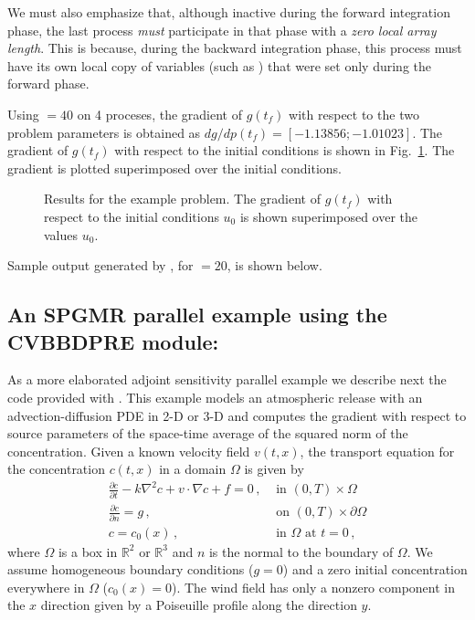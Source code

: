 We must also emphasize that, although inactive during the forward integration phase, 
the last process {\em must} participate in that phase with a 
{\em zero local array length}. 
This is because, during the backward integration phase, this process must
have its own local copy of variables (such as ) that were set
only during the forward phase.

Using  $=40$ on 4 proceses, the gradient of $g(t_f)$ with respect to 
the two problem parameters is obtained as $dg/dp(t_f) = [ -1.13856; -1.01023]$.
The gradient of $g(t_f)$ with respect to the initial conditions is shown in
Fig.~\ref{f:cvsadjnonx_p}. The gradient is plotted superimposed over the initial conditions.
\begin{figure}
  {\centerline{}}
  \caption{Results for the  example problem.
    The gradient of $g(t_f)$ with respect to the initial conditions $u_0$ 
    is shown superimposed over the values $u_0$.}
  \label{f:cvsadjnonx_p}
\end{figure}
Sample output generated by , for  $=20$, is shown below.



\newpage
\subsection{An SPGMR parallel example using the CVBBDPRE module: }
\label{ss:cvsadjkryx_p}

As a more elaborated adjoint sensitivity parallel example we describe next
the  code provided with {\cvodes}. This example models an atmospheric 
release with an advection-diffusion PDE in 2-D or 3-D and computes the gradient 
with respect to source parameters of the space-time average of the squared norm
of the concentration.
Given a known velocity field $v(t,x)$, the transport equation for
the concentration $c(t,x)$ in a domain $\Omega$ is given by
\begin{equation}\label{e:cvsadjkryx_p_PDE}
  \begin{split}
    \frac{\partial c}{\partial t} - k \nabla^2 c + v \cdot \nabla c + f = 0 \, , 
    &\text{ in } (0,T) \times \Omega \\
    \frac{\partial c}{\partial n} = g \, ,
    &\text{ on } (0,T) \times \partial\Omega \\
    c = c_0(x) \, ,
    &\text{ in } \Omega \text{ at } t = 0 \, ,
  \end{split}
\end{equation}
where $\Omega$ is a box in ${\mathbb{R}}^2$ or ${\mathbb{R}}^3$ and $n$ is the 
normal to the boundary of $\Omega$.
We assume homogeneous boundary conditions ($g = 0$) and a zero initial
concentration everywhere in $\Omega$ ($c_0(x) = 0$). The wind field has only a
nonzero component in the $x$ direction given by a Poiseuille profile along the 
direction $y$.

